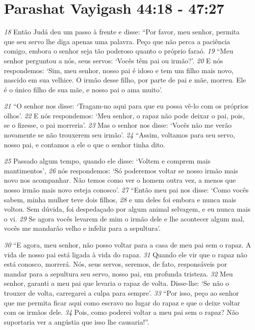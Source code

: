 \section*{Parashat Vayigash 44:18 - 47:27}


\bigskip
\textit{\tiny 18}
Então Judá deu um passo à frente e disse: “Por favor, meu senhor, permita que
seu servo lhe diga apenas uma palavra. Peço que não perca a paciência comigo,
embora o senhor seja tão poderoso quanto o próprio faraó.
\textit{\tiny 19}
“Meu senhor perguntou a nós, seus servos: ‘Vocês têm pai ou irmão?’. 
\textit{\tiny 20}
E nós
respondemos: ‘Sim, meu senhor, nosso pai é idoso e tem um filho mais novo,
nascido em sua velhice. O irmão desse filho, por parte de pai e mãe, morreu. Ele é
o único filho de sua mãe, e nosso pai o ama muito’.

\bigskip
\textit{\tiny 21}
“O senhor nos disse: ‘Tragam-no aqui para que eu possa vê-lo com os
próprios olhos’. 
\textit{\tiny 22}
E nós respondemos: ‘Meu senhor, o rapaz não pode deixar o
pai, pois, se o fizesse, o pai morreria’. 
\textit{\tiny 23}
Mas o senhor nos disse: ‘Vocês não me
verão novamente se não trouxerem seu irmão’.
\textit{\tiny 24}
“Assim, voltamos para seu servo, nosso pai, e contamos a ele o que o senhor
tinha dito. 

\bigskip
\textit{\tiny 25}
Passado algum tempo, quando ele disse: ‘Voltem e comprem mais
mantimentos’, 
\textit{\tiny 26}
nós respondemos: ‘Só poderemos voltar se nosso irmão mais
novo nos acompanhar. Não temos como ver o homem outra vez, a menos que
nosso irmão mais novo esteja conosco’.
\textit{\tiny 27}
“Então meu pai nos disse: ‘Como vocês sabem, minha mulher teve dois filhos,
\textit{\tiny 28}
e um deles foi embora e nunca mais voltou. Sem dúvida, foi despedaçado por
algum animal selvagem, e eu nunca mais o vi. 
\textit{\tiny 29}
Se agora vocês levarem de mim o
irmão dele e lhe acontecer algum mal, vocês me mandarão velho e infeliz para a
sepultura’.

\bigskip
\textit{\tiny 30}
“E agora, meu senhor, não posso voltar para a casa de meu pai sem o rapaz. A
vida de nosso pai está ligada à vida do rapaz. 
\textit{\tiny 31}
Quando ele vir que o rapaz não
está conosco, morrerá. Nós, seus servos, seremos, de fato, responsáveis por
mandar para a sepultura seu servo, nosso pai, em profunda tristeza. 
\textit{\tiny 32}
Meu
senhor, garanti a meu pai que levaria o rapaz de volta. Disse-lhe: ‘Se não o trouxer
de volta, carregarei a culpa para sempre’.
\textit{\tiny 33}
“Por isso, peço ao senhor que me permita ficar aqui como escravo no lugar
do rapaz e que o deixe voltar com os irmãos dele. 
\textit{\tiny 34}
Pois, como poderei voltar a
meu pai sem o rapaz? Não suportaria ver a angústia que isso lhe causaria!”.

